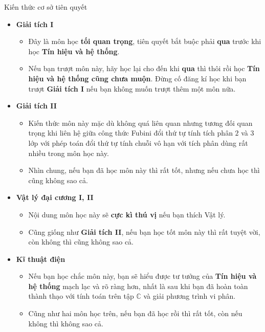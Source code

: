 \documentclass[8pt]{beamer}
\begin{document}
\begin{frame}{Kiến thức cơ sở tiên quyết}
	\begin{itemize}
		\item \textbf{Giải tích I} 
			\begin{itemize}
				\item Đây là môn học \textbf{tối quan trọng}, tiên quyết bắt buộc phải \textbf{qua} trước khi học \textbf{Tín hiệu và hệ thống}.
				\item Nếu bạn trượt môn này, hãy học lại cho đến khi \textbf{qua} thì thôi rồi học \textbf{Tín hiệu và hệ thống cũng chưa muộn}. Đừng cố đăng kí học khi bạn trượt \textbf{Giải tích I} nếu bạn không muốn trượt thêm một môn nữa.
			\end{itemize}
		\item \textbf{Giải tích II}
			\begin{itemize}
				\item Kiến thức môn này mặc dù không quá liên quan nhưng tương đối quan trọng khi liên hệ giữa công thức Fubini đổi thứ tự tính tích phân $2$ và $3$ lớp với phép toán đổi thứ tự tính chuỗi vô hạn với tích phân dùng rất nhiều trong môn học này.
				\item Nhìn chung, nếu bạn đã học  môn này thì rất tốt, nhưng nếu chưa học thì cũng không sao cả. 
			\end{itemize}
		\item \textbf{Vật lý đại cương I, II}
			\begin{itemize}
				\item Nội dung môn học này sẽ \textbf{cực kì thú vị} nếu bạn thích Vật lý.
				\item Cũng giống như \textbf{Giải tích II}, nếu bạn học tốt môn này thì rất tuyệt vời, còn không thì cũng không sao cả.
			\end{itemize}
		\item \textbf{Kĩ thuật điện}
			\begin{itemize}
				\item Nếu bạn học chắc môn này, bạn sẽ hiểu được tư tưởng của \textbf{Tín hiệu và hệ thống} mạch lạc và rõ ràng hơn, nhất là sau khi bạn đã hoàn toàn thành thạo với tính toán trên tập $\mathbb{C}$ và giải phương trình vi phân.
				\item Cũng như hai môn học trên, nếu bạn đã học rồi thì rất tốt, còn nếu không thì không sao cả.
			\end{itemize}
	\end{itemize}
\end{frame}
\end{document}
